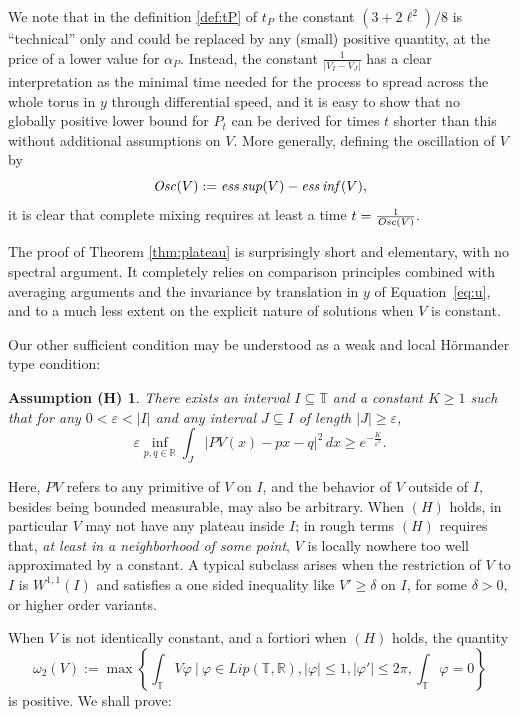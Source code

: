\documentclass[12pt]{article}
\newtheorem*{AH}{Assumption (H)}
\newcommand{\R}{\mathbb{R}}
\newcommand{\T}{\mathbb{T}}
\newcommand{\eps}{\varepsilon}
\begin{document}
We note that in the definition \eqref{def:tP} of $t_P$ the constant 
$(3 + 2\ell^2)/8$ is ``technical'' only and could be replaced by any 
(small) positive quantity, at the price of a lower value for $\alpha_P$. 
Instead, the constant $\frac{1}{|V_I - V_J|}$ has a clear interpretation 
as the minimal time needed for the process to spread across the whole torus 
in $y$ through  differential speed, and it is easy to show that no 
globally positive lower 
bound for $P_t$ can be derived for times $t$ shorter than this without 
additional assumptions on $V.$ More generally, defining the oscillation of $V$ by 
\begin{equation}\label{def:Osc}
{\it Osc}(V) := {\it ess\,sup}(V) - {\it ess\,inf}(V),
\end{equation}
it is clear that complete mixing requires at least a time $ t = \frac{1}{{\it Osc}(V)}.$

\smallskip

The proof of Theorem \ref{thm:plateau} is surprisingly short and 
elementary, with no spectral argument. It completely relies 
on comparison principles combined with averaging arguments
and the invariance by translation in $y$ of Equation~\eqref{eq:u}, and
to a much less extent on the explicit nature of solutions when $V$ is constant.

\medskip

\noindent Our other sufficient condition may be understood as a weak and 
local H\"ormander type condition:

\begin{AH} 
There exists an interval $I \subseteq \T$ and a constant $K \geq 1$ 
such that for any $0 < \eps < |I|$ and any interval $J \subseteq I$
of length $|J| \geq \eps$, 
$$
\eps \inf_{p,q \in \R} \int_J \big| PV(x) - px-q\big|^2\, dx \geq  
e^{-\frac{K}{\eps^2}}.
$$ 
\end{AH}
\noindent Here, $PV$ refers to any primitive of $V$ on $I$, and
the behavior of $V$ outside of $I$, besides being bounded measurable, 
may also be arbitrary. When $(H)$ holds, in particular $V$ may not  
have any plateau inside $I$; in rough terms $(H)$ requires 
that, {\it at least in a neighborhood of some point}, $V$ is 
locally nowhere too well approximated by 
a constant. A typical subclass arises when the restriction of $V$ 
to $I$ is $W^{1,1}(I)$ and satisfies a one sided inequality like 
$V' \geq \delta$ on $I$, for some $\delta > 0,$ or higher order variants. 

\medskip\noindent
When $V$ is not identically constant, and a fortiori when $(H)$ holds, the
quantity
\begin{equation}\label{def:w2-prop1}
    \omega_2(V) := \max \left\{ \int_{\T} V\varphi \ | \ \varphi \in Lip(\T,\R), |\varphi| \leq 1, 
|\varphi'|\leq 2\pi, \int_{\T}\varphi = 0\right\}
\end{equation}
is positive. We shall prove:
\end{document}

